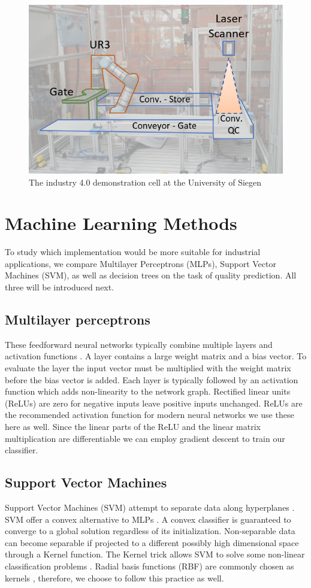 \documentclass[5p,times,procedia]{elsarticle}
\begin{document}
\begin{figure}
       \includegraphics[width=.45\textwidth]{img/demozelle}
       \caption{The industry 4.0 demonstration cell at the University of Siegen}
\label{fig:ind_cell}
\end{figure}

\section{Machine Learning Methods} \label{sec:ML} %

To study which implementation would be more suitable for industrial applications, we compare Multilayer Perceptrons (MLPs), Support Vector Machines (SVM), as well as decision trees on the task of quality prediction. All three will be introduced next.

\subsection{Multilayer perceptrons}
These feedforward neural networks typically combine multiple layers
and activation functions \cite{bishop2006pattern}.
A layer contains a large weight matrix and
a bias vector. To evaluate the layer the input vector must be
multiplied with the weight matrix before the bias vector is added.
Each layer is typically followed by an activation function 
which adds non-linearity to the network graph. Rectified linear units
(ReLUs) are zero for negative inputs leave positive inputs unchanged.
ReLUs are the recommended activation function for modern neural
networks \cite{goodfellow2016deep} we use these here as well.
Since the linear parts of the ReLU and the linear matrix multiplication
are differentiable we can employ gradient descent to train our 
classifier.

\subsection{Support Vector Machines}
Support Vector Machines (SVM) attempt to separate data
along hyperplanes \cite{aggarwal2015data}. 
SVM offer a convex alternative to MLPs \cite{Suykens2002least}.
A convex classifier is guaranteed to converge to a global solution
regardless of its initialization.
Non-separable data can become separable if projected to a different
possibly high dimensional space through a Kernel function.
The Kernel trick allows SVM to solve some non-linear
classification problems \cite{Suykens2002least}.
Radial basis functions (RBF) are commonly chosen as kernels
\cite{Suykens2002least}, therefore, we choose to follow this practice as well.
\end{document}
